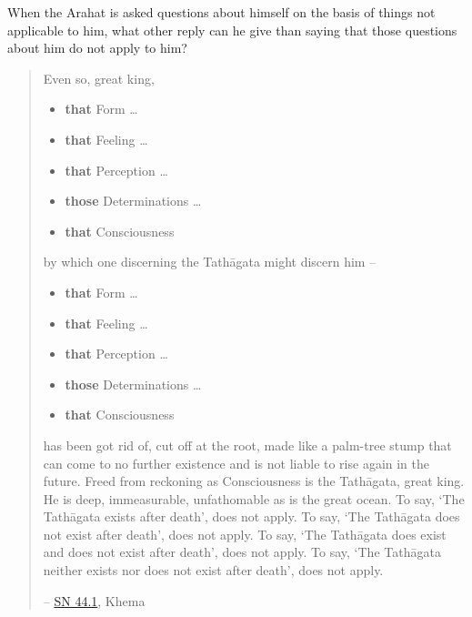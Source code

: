 When the Arahat is asked questions about himself on the basis of things not applicable to him, what other reply can he give than saying that those questions about him do not apply to him?

\begin{quote}
Even so, great king,

\begin{itemize}
\item
  \textbf{that} Form \ldots\hspace{0pt}
\item
  \textbf{that} Feeling \ldots\hspace{0pt}
\item
  \textbf{that} Perception \ldots\hspace{0pt}
\item
  \textbf{those} Determinations \ldots\hspace{0pt}
\item
  \textbf{that} Consciousness
\end{itemize}

by which one discerning the Tathāgata might discern him -- 

\begin{itemize}
\item
  \textbf{that} Form \ldots\hspace{0pt}
\item
  \textbf{that} Feeling \ldots\hspace{0pt}
\item
  \textbf{that} Perception \ldots\hspace{0pt}
\item
  \textbf{those} Determinations \ldots\hspace{0pt}
\item
  \textbf{that} Consciousness
\end{itemize}

has been got rid of, cut off at the root, made like a palm-tree stump that can come to no further existence and is not liable to rise again in the future. Freed from reckoning as Consciousness is the Tathāgata, great king. He is deep, immeasurable, unfathomable as is the great ocean. To say, `The Tathāgata exists after death', does not apply. To say, `The Tathāgata does not exist after death', does not apply. To say, `The Tathāgata does exist and does not exist after death', does not apply. To say, `The Tathāgata neither exists nor does not exist after death', does not apply.

 -- \href{https://suttacentral.net/sn44.1/en/bodhi}{SN 44.1}, Khema
\end{quote}

